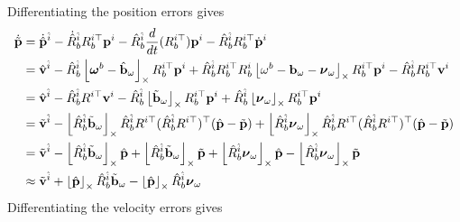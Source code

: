 Differentiating the position errors gives
\begin{align*}
    \dot{\tilde{\mathbf{p}}} &= \dot{\hat{\mathbf{p}}}^{\hat{i}}-\dot{\hat{R}}_b^{\hat{i}} R_b^{i\top}\mathbf{p}^i - \hat{R}_b^{\hat{i}}\frac{d}{dt}(R_b^{i\top}) \mathbf{p}^i - \hat{R}_b^{\hat{i}}R_b^{i\top} \dot{\mathbf{p}}^i \\
     &= \hat{\mathbf{v}}^{\hat{i}} - \hat{R}_b^{\hat{i}}\left\lfloor\boldsymbol{\omega}^b-\hat{\mathbf{b}}_\omega\right\rfloor_{\times} R_b^{i\top} \mathbf{p}^i + \hat{R}_b^{\hat{i}} R_b^{i\top} R_b^i\left\lfloor\omega^b-\mathbf{b}_\omega-\boldsymbol{\nu}_\omega\right\rfloor_{\times} R_b^{i\top} \mathbf{p}^i - \hat{R}_b^{\hat{i}} R_b^{i\top} \mathbf{v}^i \\
     &= \hat{\mathbf{v}}^{\hat{i}} - \hat{R}_b^{\hat{i}}R^{i\top} \mathbf{v}^i   - \hat{R}_b^{\hat{i}}\left\lfloor\tilde{\mathbf{b}}_\omega\right\rfloor_{\times} R_b^{i\top} \mathbf{p}^i + \hat{R}_b^{\hat{i}}\left\lfloor\boldsymbol{\nu}_\omega\right\rfloor_{\times}R_b^{i\top}\mathbf{p}^i \\ 
    &= \tilde{\mathbf{v}}^{\hat{i}}  - \left\lfloor\hat{R}_b^{\hat{i}}\tilde{\mathbf{b}}_\omega\right\rfloor_{\times}\hat{R}_b^{\hat{i}}R^{i\top} (\hat{R}_b^{\hat{i}}R^{i\top})^\top(\hat{\mathbf{p}}-\tilde{\mathbf{p}}) + \left\lfloor\hat{R}_b^{\hat{i}}\boldsymbol{\nu}_\omega\right\rfloor_{\times}\hat{R}_b^{\hat{i}}R^{i\top} (\hat{R}_b^{\hat{i}}R^{i\top})^\top(\hat{\mathbf{p}}-\tilde{\mathbf{p}}) \\
    &= \tilde{\mathbf{v}}^{\hat{i}}  - \left\lfloor\hat{R}_b^{\hat{i}}\tilde{\mathbf{b}}_\omega\right\rfloor_{\times}\hat{\mathbf{p}} + \left\lfloor\hat{R}_b^{\hat{i}}\tilde{\mathbf{b}}_\omega\right\rfloor_{\times}\tilde{\mathbf{p}}
    	+ \left\lfloor\hat{R}_b^{\hat{i}}\boldsymbol{\nu}_\omega\right\rfloor_{\times}\hat{\mathbf{p}} - \left\lfloor\hat{R}_b^{\hat{i}}\boldsymbol{\nu}_\omega\right\rfloor_{\times}\tilde{\mathbf{p}} \\   
    &\approx \tilde{\mathbf{v}}^{\hat{i}}  + \left\lfloor\hat{\mathbf{p}}\right\rfloor_{\times} \hat{R}_b^{\hat{i}}\tilde{\mathbf{b}}_\omega - \left\lfloor\hat{\mathbf{p}}\right\rfloor_{\times} \hat{R}_b^{\hat{i}}\boldsymbol{\nu}_\omega \\     
\end{align*}
Differentiating the velocity errors gives
